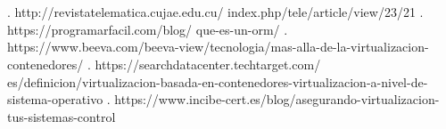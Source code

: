 \documentclass[twoside,twocolumn]{article}
\begin{document}
\begin{flushright}
\begin{itemize}
\textbf{}\\
\textbf{}\\

\begin{thebibliography}{99} %



. http://revistatelematica.cujae.edu.cu/
index.php/tele/article/view/23/21
 \break
{}. https://programarfacil.com/blog/
que-es-un-orm/
\break
{}. https://www.beeva.com/beeva-view/tecnologia/mas-alla-de-la-virtualizacion-contenedores/
\break
{}. https://searchdatacenter.techtarget.com/
es/definicion/virtualizacion-basada-en-contenedores-virtualizacion-a-nivel-de-sistema-operativo
\break
{}. https://www.incibe-cert.es/blog/asegurando-virtualizacion-tus-sistemas-control
\break


\newblock {\em }
 
\end{thebibliography}

\end{itemize}
\end{flushright}
\end{document}
